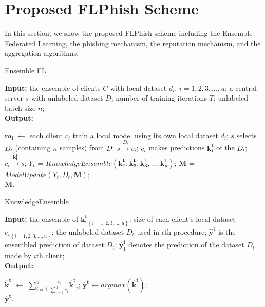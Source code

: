 \documentclass[journal]{IEEEtran}
\begin{document}
\section{Proposed FLPhish Scheme}
In this section, we show the proposed FLPhish scheme including the Ensemble Federated Learning, the phishing mechanism, the reputation mechanism, and the aggregation algorithms.

\begin{algorithm}[t]
  \caption{Ensemble FL} %
  \label{alg:system}
  \hspace*{0.02in} {\bf Input:} %
  the ensemble of clients $C$ with local dataset $d_i$, $i=1,2,3,...,u$; a central server $s$ with unlabeled dataset $D$; number of training iterations $T$; unlabeled batch size $n$;\\
  \hspace*{0.02in} {\bf Output:} %
  \begin{algorithmic}[1]
    \State $\mathbf{m_i}$ $\gets$ each client $c_i$ train a local model using its own local dataset $d_i$;
      \State $s$ selects $D_t$ (containing $n$ samples) from $D$;
        \State $s \overset{D_{t}}{\rightarrow} c_{i}$;
        \State $c_i$ makes predictions $\mathbf{k_i^t}$ of the $D_t$;
        \State $c_i \overset{\mathbf{k_i^t}}{\rightarrow} s$;
      \EndFor
      \State $Y_t$ = $KnowledgeEnsemble(\mathbf{k_1^t},\mathbf{k_2^t},\mathbf{k_3^t},...,\mathbf{k_u^t})$;
      \State $\mathbf{M}$ = $ModelUpdate(Y_t, D_t, \mathbf{M})$;
    \EndFor \\
    \Return $\mathbf{M}$.
  \end{algorithmic}
\end{algorithm}
\begin{algorithm}[t]
  \caption{KnowledgeEnsemble} %
  \label{alg:KnowledgeEnsemble}
  \hspace*{0.02in} {\bf Input:} %
  the ensemble of ${\mathbf{k_i^t}}_{\left \{ i= 1,2,3,...,u \right \}}$; size of each client's local dataset ${e_i}_{\left \{ i= 1,2,3,...,u \right \}}$; the unlabeled dataset $D_t$ used in $t$th procedure; $\mathbf{\hat{y}^t}$ is the ensembled prediction of dataset $D_t$; $\mathbf{\hat{y}^t_l}$ denotes the prediction of the dataset $D_t$ made by $i$th client;\\
  \hspace*{0.02in} {\bf Output:} %
  \begin{algorithmic}[1]
      \State $\mathbf{\hat{k}^t}$ $\gets$ $\sum_{i=1}^{u}\frac{e_i}{\sum_{i=1}^{u}e_i}\mathbf{\hat{k}^t}_i$;
      \State $\mathbf{\hat{y}^t}\gets argmax(\mathbf{\hat{k}^t})$;
    \EndFor \\
    \Return $\mathbf{\hat{y}^t}$.
  \end{algorithmic}

\end{algorithm}
\end{document}
